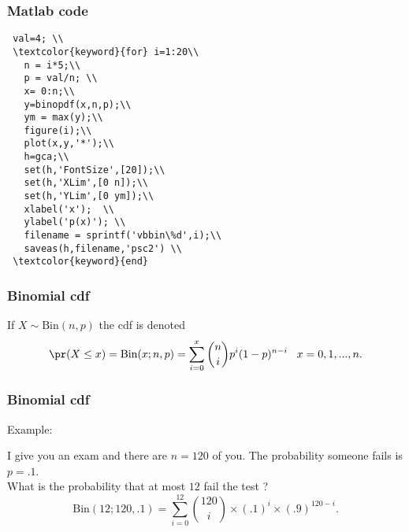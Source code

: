 \begin{frame}[fragile]\frametitle{Matlab code}

{\tiny

\begin{lstlisting}
 val=4; \\
 \textcolor{keyword}{for} i=1:20\\
   n = i*5;\\
   p = val/n; \\
   x= 0:n;\\
   y=binopdf(x,n,p);\\
   ym = max(y);\\
   figure(i);\\
   plot(x,y,'*');\\
   h=gca;\\
   set(h,'FontSize',[20]);\\
   set(h,'XLim',[0 n]);\\
   set(h,'YLim',[0 ym]);\\
   xlabel('x');  \\
   ylabel('p(x)'); \\
   filename = sprintf('vbbin\%d',i);\\
   saveas(h,filename,'psc2') \\
 \textcolor{keyword}{end}
\end{lstlisting}
}
\end{frame}




\begin{frame}[fragile]\frametitle{Binomial cdf}

\begin{thm}
If $X \sim \mbox{Bin}(n,p)$ the cdf is denoted
$$\pr(X \leq x) = \mbox{Bin}(x;n,p) = \sum_{i=0}^x \binom{n}{i} p^i (1-p)^{n-i} \, \, \, \, \, x=0,1,...,n.$$ 
\end{thm}


\end{frame}



\begin{frame}[fragile]\frametitle{Binomial cdf}

Example:

I give you an exam and there are $n=120$ of you. The probability
someone fails is $p=.1$. \\ 

What is the probability that at most $12$ fail the test ?  
$$\mbox{Bin}(12;120,.1) =  \sum_{i=0}^{12} \binom{120}{i}\times (.1)^i
\times (.9)^{120-i}.$$


\end{frame}



